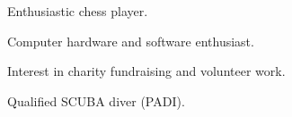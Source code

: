 



\begin{cvitems}
\item {Enthusiastic chess player.}
\item {Computer hardware and software enthusiast.}
\item {Interest in charity fundraising and volunteer work.}
\item {Qualified SCUBA diver (PADI).}
\end{cvitems}

